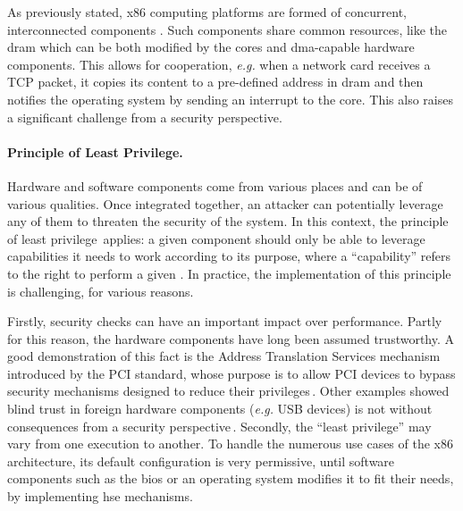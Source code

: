 As previously stated, x86 computing platforms are formed of concurrent,
interconnected components .
%
Such components share common resources, like the \ac{dram} which can be both modified by the
cores and \ac{dma}-capable hardware components.
%
This allows for cooperation, \emph{e.g.} when a network card receives a TCP
packet, it copies its content to a pre-defined address in \ac{dram} and then
notifies the operating system by sending an interrupt to the core.
%
This also raises a significant challenge from a security perspective.

\paragraph{Principle of Least Privilege.}
%
Hardware and software components come from various places and can be of various
qualities.
%
Once integrated together, an attacker can potentially leverage any of them to
threaten the security of the system.
%
In this context, the principle of least
privilege\,\cite{saltzer1975leastprivilege} applies: a given component should
only be able to leverage capabilities it needs to work according to its purpose,
where a ``capability'' refers to the right to perform a given \IO.
%
In practice, the implementation of this principle is challenging, for various
reasons.

Firstly, security checks can have an important impact over performance.
%
Partly for this reason, the hardware components have long been assumed
trustworthy.
%
A good demonstration of this fact is the Address Translation Services mechanism
introduced by the PCI standard, whose purpose is to allow PCI devices to bypass
security mechanisms designed to reduce their
privileges\,\cite{daubignard2017protip}.
%
Other examples showed blind trust in foreign hardware components
(\emph{e.g.} USB devices) is not without consequences from a security
perspective\,\cite{nohl2014badusb,hudson2015thunderstrike,chifflier2013uefi}.
%
Secondly, the ``least privilege'' may vary from one execution to another. 
%
To handle the numerous use cases of the x86 architecture, its default
configuration is very permissive, until software components such as the
\ac{bios} or an operating system modifies it to fit their needs, by
implementing \ac{hse} mechanisms.

